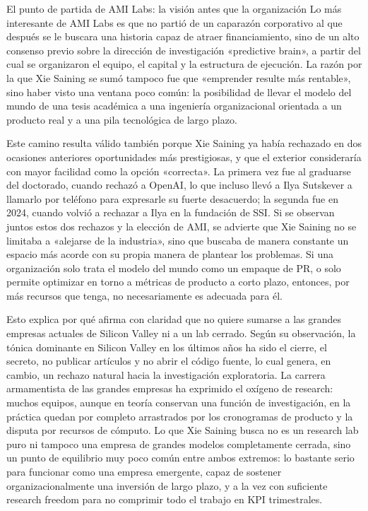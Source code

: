 \documentclass[a4paper,12pt]{article}
\begin{document}
\begin{importantbox}{El punto de partida de AMI Labs: la visión antes que la organización}
Lo más interesante de AMI Labs es que no partió de un caparazón corporativo al que después se le buscara una historia capaz de atraer financiamiento, sino de un alto consenso previo sobre la dirección de investigación «predictive brain», a partir del cual se organizaron el equipo, el capital y la estructura de ejecución. La razón por la que Xie Saining se sumó tampoco fue que «emprender resulte más rentable», sino haber visto una ventana poco común: la posibilidad de llevar el modelo del mundo de una tesis académica a una ingeniería organizacional orientada a un producto real y a una pila tecnológica de largo plazo.
\end{importantbox}

Este camino resulta válido también porque Xie Saining ya había rechazado en dos ocasiones anteriores oportunidades más prestigiosas, y que el exterior consideraría con mayor facilidad como la opción «correcta». La primera vez fue al graduarse del doctorado, cuando rechazó a OpenAI, lo que incluso llevó a Ilya Sutskever a llamarlo por teléfono para expresarle su fuerte desacuerdo; la segunda fue en 2024, cuando volvió a rechazar a Ilya en la fundación de SSI. Si se observan juntos estos dos rechazos y la elección de AMI, se advierte que Xie Saining no se limitaba a «alejarse de la industria», sino que buscaba de manera constante un espacio más acorde con su propia manera de plantear los problemas. Si una organización solo trata el modelo del mundo como un empaque de PR, o solo permite optimizar en torno a métricas de producto a corto plazo, entonces, por más recursos que tenga, no necesariamente es adecuada para él.

Esto explica por qué afirma con claridad que no quiere sumarse a las grandes empresas actuales de Silicon Valley ni a un lab cerrado. Según su observación, la tónica dominante en Silicon Valley en los últimos años ha sido el cierre, el secreto, no publicar artículos y no abrir el código fuente, lo cual genera, en cambio, un rechazo natural hacia la investigación exploratoria. La carrera armamentista de las grandes empresas ha exprimido el oxígeno de research: muchos equipos, aunque en teoría conservan una función de investigación, en la práctica quedan por completo arrastrados por los cronogramas de producto y la disputa por recursos de cómputo. Lo que Xie Saining busca no es un research lab puro ni tampoco una empresa de grandes modelos completamente cerrada, sino un punto de equilibrio muy poco común entre ambos extremos: lo bastante serio para funcionar como una empresa emergente, capaz de sostener organizacionalmente una inversión de largo plazo, y a la vez con suficiente research freedom para no comprimir todo el trabajo en KPI trimestrales.
\end{document}
